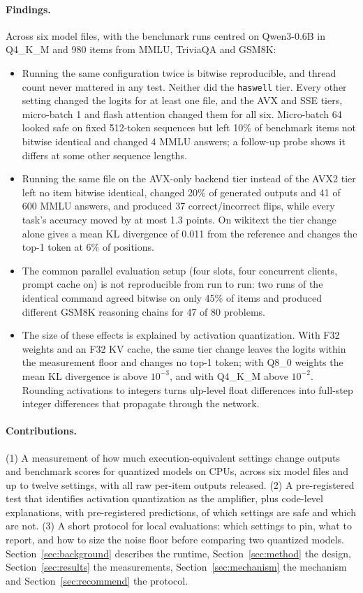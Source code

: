 \paragraph{Findings.}
Across six model files, with the benchmark runs centred on Qwen3-0.6B in Q4\_K\_M and 980 items
from MMLU, TriviaQA and GSM8K:
\begin{itemize}
\item Running the same configuration twice is bitwise reproducible, and thread count never
mattered in any test. Neither did the \texttt{haswell} tier. Every other setting changed the
logits for at least one file, and the AVX and SSE tiers, micro-batch 1 and flash attention
changed them for all six. Micro-batch 64 looked safe on fixed 512-token sequences but left 10\% of benchmark items
not bitwise identical and changed 4 MMLU answers; a follow-up probe shows it differs at some other sequence lengths.
\item Running the same file on the AVX-only backend tier instead of the AVX2 tier left no item
bitwise identical, changed 20\% of generated outputs and 41 of 600 MMLU answers, and produced 37
correct/incorrect flips, while every task's accuracy moved by at most 1.3 points. On wikitext the
tier change alone gives a mean KL divergence of 0.011 from the reference and changes the top-1
token at 6\% of positions.
\item The common parallel evaluation setup (four slots, four concurrent clients, prompt cache on)
is not reproducible from run to run: two runs of the identical command agreed bitwise on only
45\% of items and produced different GSM8K reasoning chains for 47 of 80 problems.
\item The size of these effects is explained by activation quantization. With F32 weights and
an F32 KV cache, the same tier change leaves the logits within the measurement floor and changes
no top-1 token; with Q8\_0 weights the mean KL divergence is above $10^{-3}$, and with Q4\_K\_M
above $10^{-2}$. Rounding activations to integers turns ulp-level float differences into
full-step integer differences that propagate through the network.
\end{itemize}

\paragraph{Contributions.}
(1) A measurement of how much execution-equivalent settings change outputs and benchmark scores
for quantized models on CPUs, across six model files and up to twelve settings, with all raw
per-item outputs released. (2) A pre-registered test that identifies activation quantization as
the amplifier, plus code-level explanations, with pre-registered predictions, of which settings
are safe and which are not. (3) A short protocol for local evaluations: which settings to pin,
what to report, and how to size the noise floor before comparing two quantized models.
Section~\ref{sec:background} describes the runtime, Section~\ref{sec:method} the design,
Section~\ref{sec:results} the measurements, Section~\ref{sec:mechanism} the mechanism and
Section~\ref{sec:recommend} the protocol.
